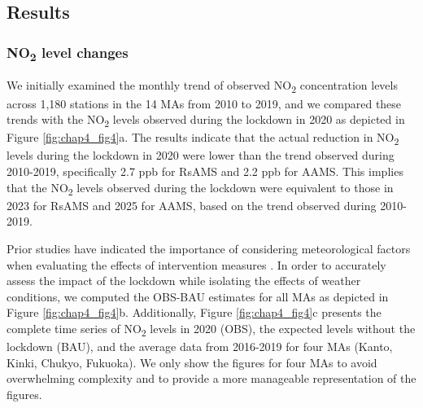 \subsection{Results} \label{chap4_result}
\subsubsection{NO\textsubscript{2} level changes}
We initially examined the monthly trend of observed NO\textsubscript{2} concentration levels across 1,180 stations in the 14 MAs from 2010 to 2019, and we compared these trends with the NO\textsubscript{2} levels observed during the lockdown in 2020 as depicted in Figure \ref{fig:chap4_fig4}a. The results indicate that the actual reduction in NO\textsubscript{2} levels during the lockdown in 2020 were lower than the trend observed during 2010-2019, specifically 2.7 ppb for RsAMS and 2.2 ppb for AAMS. This implies that the NO\textsubscript{2} levels observed during the lockdown were equivalent to those in 2023 for RsAMS and 2025 for AAMS, based on the trend observed during 2010-2019. \par

Prior studies have indicated the importance of considering meteorological factors when evaluating the effects of intervention measures \citep{ordonez2020early,grange2021covid,shi2021abrupt}. In order to accurately assess the impact of the lockdown while isolating the effects of weather conditions, we computed the OBS-BAU estimates for all MAs as depicted in Figure \ref{fig:chap4_fig4}b. Additionally, Figure \ref{fig:chap4_fig4}c presents the complete time series of NO\textsubscript{2} levels in 2020 (OBS), the expected levels without the lockdown (BAU), and the average data from 2016-2019 for four MAs (Kanto, Kinki, Chukyo, Fukuoka). We only show the figures for four MAs to avoid overwhelming complexity and to provide a more manageable representation of the figures. \par

